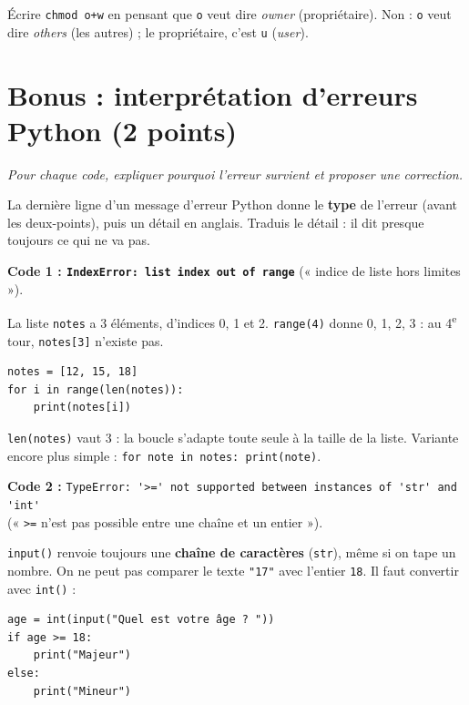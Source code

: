 \documentclass[addpoints, 11pt]{exam}
\newcommand{\enonce}[1]{\textit{#1}\par\smallskip}
\newcommand{\code}[1]{\texttt{#1}}
\DeclareRobustCommand{\_}{\textunderscore\allowbreak}
\begin{document}
\begin{questions}
\begin{parts}
\begin{erreur}
Écrire \code{chmod o+w} en pensant que \code{o} veut dire \textit{owner} (propriétaire). Non : \code{o} veut dire \textit{others} (les autres) ; le propriétaire, c'est \code{u} (\textit{user}).
\end{erreur}
\end{parts}

\section{Bonus : interprétation d'erreurs Python (2 points)}

\question[2] \enonce{Pour chaque code, expliquer pourquoi l'erreur survient et proposer une correction.}

\begin{astuce}
La dernière ligne d'un message d'erreur Python donne le \textbf{type} de l'erreur (avant les deux-points), puis un détail en anglais. Traduis le détail : il dit presque toujours ce qui ne va pas.
\end{astuce}

\textbf{Code 1 : \code{IndexError: list index out of range}} (« indice de liste hors limites »).
\begin{reponse}
La liste \code{notes} a 3 éléments, d'indices 0, 1 et 2. \code{range(4)} donne 0, 1, 2, 3 : au 4\textsuperscript{e} tour, \code{notes[3]} n'existe pas.
\begin{lstlisting}
notes = [12, 15, 18]
for i in range(len(notes)):
    print(notes[i])
\end{lstlisting}
\end{reponse}
\code{len(notes)} vaut 3 : la boucle s'adapte toute seule à la taille de la liste. Variante encore plus simple : \code{for note in notes: print(note)}.

\textbf{Code 2 :} \lstinline[style=terminal]!TypeError: '>=' not supported between instances of 'str' and 'int'!\\ (« \code{>=} n'est pas possible entre une chaîne et un entier »).
\begin{reponse}
\code{input()} renvoie toujours une \textbf{chaîne de caractères} (\code{str}), même si on tape un nombre. On ne peut pas comparer le texte \code{"17"} avec l'entier \code{18}. Il faut convertir avec \code{int()} :
\begin{lstlisting}
age = int(input("Quel est votre âge ? "))
if age >= 18:
    print("Majeur")
else:
    print("Mineur")
\end{lstlisting}
\end{reponse}


\end{questions}
\end{document}
